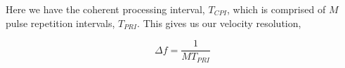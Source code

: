 \documentclass[preview]{standalone}
\begin{document}
\begin{center}
Here we have the coherent processing interval, $T_{CPI}$, which is comprised of $M$ pulse repetition intervals, $T_{PRI}$. This gives us our velocity resolution, 

\begin{equation}
    \Delta f = \frac{1}{M T_{PRI}}
\end{equation}
\end{center}
\end{document}
